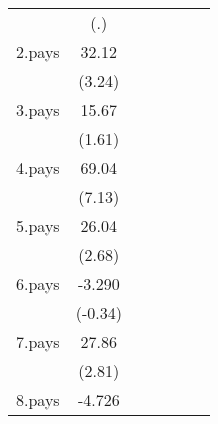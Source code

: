 {\begin{tabular}{l*{6}{c}}
                    &         (.)         &                     &                     &                     &                     &                     \\
[1em]
2.pays              &       32.12\sym{**} &                     &                     &                     &                     &                     \\
                    &      (3.24)         &                     &                     &                     &                     &                     \\
[1em]
3.pays              &       15.67         &                     &                     &                     &                     &                     \\
                    &      (1.61)         &                     &                     &                     &                     &                     \\
[1em]
4.pays              &       69.04\sym{***}&                     &                     &                     &                     &                     \\
                    &      (7.13)         &                     &                     &                     &                     &                     \\
[1em]
5.pays              &       26.04\sym{**} &                     &                     &                     &                     &                     \\
                    &      (2.68)         &                     &                     &                     &                     &                     \\
[1em]
6.pays              &      -3.290         &                     &                     &                     &                     &                     \\
                    &     (-0.34)         &                     &                     &                     &                     &                     \\
[1em]
7.pays              &       27.86\sym{**} &                     &                     &                     &                     &                     \\
                    &      (2.81)         &                     &                     &                     &                     &                     \\
[1em]
8.pays              &      -4.726         &                     &                     &                     &                     &                     \\

\end{tabular}}
